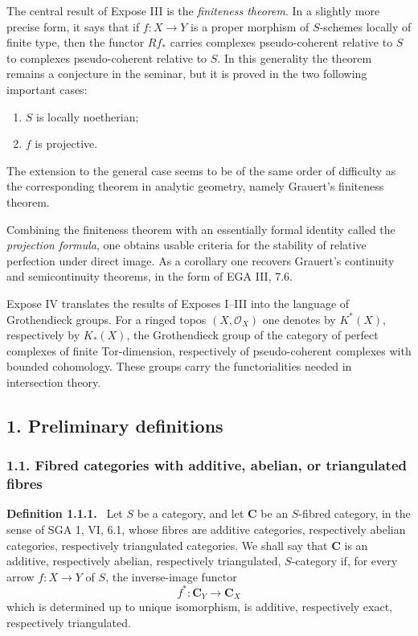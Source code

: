 \documentclass[14pt]{extarticle}
\newcommand{\cO}{\mathcal O}
\newenvironment{statement}[1]{\par\medskip\noindent\textbf{#1.}\ }{\par\medskip}
\begin{document}
The central result of Expose III is the \emph{finiteness theorem}. In a slightly more precise form, it says that if $f:X\to Y$ is a proper morphism of $S$-schemes locally of finite type, then the functor $Rf_*$ carries complexes pseudo-coherent relative to $S$ to complexes pseudo-coherent relative to $S$. In this generality the theorem remains a conjecture in the seminar, but it is proved in the two following important cases:
\begin{enumerate}[label=\alph*)]
\item $S$ is locally noetherian;
\item $f$ is projective.
\end{enumerate}
The extension to the general case seems to be of the same order of difficulty as the corresponding theorem in analytic geometry, namely Grauert's finiteness theorem.

Combining the finiteness theorem with an essentially formal identity called the \emph{projection formula}, one obtains usable criteria for the stability of relative perfection under direct image. As a corollary one recovers Grauert's continuity and semicontinuity theorems, in the form of EGA III, 7.6.

Expose IV translates the results of Exposes I--III into the language of Grothendieck groups. For a ringed topos $(X,\cO_X)$ one denotes by $K^*(X)$, respectively by $K_*(X)$, the Grothendieck group of the category of perfect complexes of finite Tor-dimension, respectively of pseudo-coherent complexes with bounded cohomology. These groups carry the functorialities needed in intersection theory.

\subsection*{1. Preliminary definitions}

\subsubsection*{1.1. Fibred categories with additive, abelian, or triangulated fibres}

\begin{statement}{Definition 1.1.1}
Let $S$ be a category, and let $\mathbf C$ be an $S$-fibred category, in the sense of SGA 1, VI, 6.1, whose fibres are additive categories, respectively abelian categories, respectively triangulated categories. We shall say that $\mathbf C$ is an additive, respectively abelian, respectively triangulated, $S$-category if, for every arrow $f:X\to Y$ of $S$, the inverse-image functor
\[
   f^*:\mathbf C_Y\longrightarrow \mathbf C_X
\]
which is determined up to unique isomorphism, is additive, respectively exact, respectively triangulated.
\end{statement}
\end{document}
